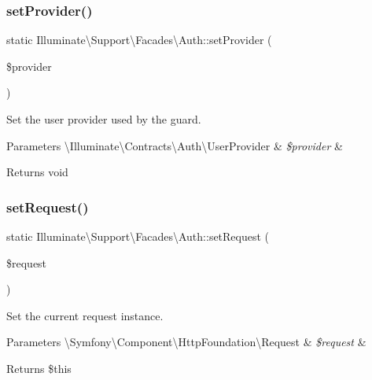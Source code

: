 \subsubsection{\texorpdfstring{set\+Provider()}{setProvider()}}
{\footnotesize\ttfamily static Illuminate\textbackslash{}\+Support\textbackslash{}\+Facades\textbackslash{}\+Auth\+::set\+Provider (\begin{DoxyParamCaption}\item[{}]{\$provider }\end{DoxyParamCaption})\hspace{0.3cm}{\ttfamily [static]}}

Set the user provider used by the guard.


\begin{DoxyParams}[1]{Parameters}
\textbackslash{}\+Illuminate\textbackslash{}\+Contracts\textbackslash{}\+Auth\textbackslash{}\+User\+Provider & {\em \$provider} & \\
\hline
\end{DoxyParams}
\begin{DoxyReturn}{Returns}
void 
\end{DoxyReturn}
\mbox{\label{class_illuminate_1_1_support_1_1_facades_1_1_auth_ae0cb110e3c059aae5571e6ed4b11bd3b}} 
\subsubsection{\texorpdfstring{set\+Request()}{setRequest()}}
{\footnotesize\ttfamily static Illuminate\textbackslash{}\+Support\textbackslash{}\+Facades\textbackslash{}\+Auth\+::set\+Request (\begin{DoxyParamCaption}\item[{}]{\$request }\end{DoxyParamCaption})\hspace{0.3cm}{\ttfamily [static]}}

Set the current request instance.


\begin{DoxyParams}[1]{Parameters}
\textbackslash{}\+Symfony\textbackslash{}\+Component\textbackslash{}\+Http\+Foundation\textbackslash{}\+Request & {\em \$request} & \\
\hline
\end{DoxyParams}
\begin{DoxyReturn}{Returns}
\$this 
\end{DoxyReturn}
\mbox{\label{class_illuminate_1_1_support_1_1_facades_1_1_auth_aef0606291d204ec7554b9afab827ceb7}} 
